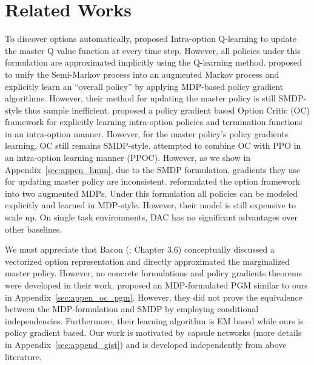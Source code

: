 \section{Related Works}
\label{sec:review}

To discover options automatically, 
proposed Intra-option Q-learning to update the master Q value
function at every time step. However, all policies under this
formulation are approximated implicitly using the Q-learning
method.  proposed to unify the
Semi-Markov process into an augmented Markov process and
explicitly learn an ``overall policy'' by applying MDP-based
policy gradient algorithms. However, their method for updating
the master policy is still SMDP-style thus sample inefficient.
 proposed a policy gradient based
Option Critic (OC) framework for explicitly learning intra-option
policies and termination functions in an intra-option manner.
However, for the master policy's policy gradients learning, OC
still remains SMDP-style. 
attempted to combine OC with PPO in an intra-option learning
manner (PPOC). However, as we show in
Appendix~\ref{sec:appen_hmm}, due to the SMDP formulation,
gradients they use for updating master policy are inconsistent.
 reformulated the option framework into
two augmented MDPs. Under this formulation all policies can be
modeled explicitly and learned in MDP-style. However, their model
is still expensive to scale up. On single task environments, DAC
has no significant advantages over other baselines.

We must appreciate that Bacon (\cite{bacon2018temporal}; Chapter
3.6) conceptually discussed a vectorized option representation
and directly approximated the marginalized master policy.
However, no concrete formulations and policy gradients theorems
were developed in their work. 
proposed an MDP-formulated PGM similar to ours in
Appendix~\ref{sec:appen_oc_pgm}. However, they did not prove the
equivalence between the MDP-formulation and SMDP by employing
conditional independencies. Furthermore, their learning algorithm
is EM based while ours is policy gradient based. Our work is
motivated by capsule networks 
(more details in Appendix~\ref{sec:append_gist}) and is developed
independently from above literature.

